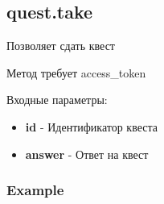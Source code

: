 \subsection{quest.take}
Позволяет сдать квест

Метод требует access\_token

Входные параметры:
\begin{itemize}
  \item \textbf{id} - Идентификатор квеста
  \item \textbf{answer} - Ответ на квест
\end{itemize}

\subsubsection{Example}
\begin{Verbatim}[frame=single]

\end{Verbatim}